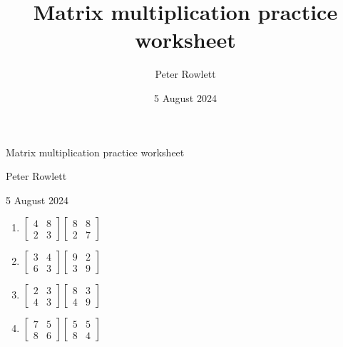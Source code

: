 \documentclass[20pt]{extarticle}
\title{Matrix multiplication practice worksheet}
\author{Peter Rowlett}
\date{5 August 2024}
\begin{document}
    \centering
    \huge Matrix multiplication practice worksheet\medskip
    
    \Large
    Peter Rowlett\medskip
    
    5 August 2024\bigskip\bigskip
    
    \begin{minipage}{0.7\linewidth}
        \begin{multicols}{3}
            \begin{enumerate}
                \item \(\begin{bmatrix}
                        4 & 8\\
                        2 & 3
                    \end{bmatrix}\begin{bmatrix}
                        8 & 8\\
                        2 & 7
                    \end{bmatrix}\)
                \item \(\begin{bmatrix}
                        3 & 4\\
                        6 & 3
                    \end{bmatrix}\begin{bmatrix}
                        9 & 2\\
                        3 & 9
                    \end{bmatrix}\)
                \item \(\begin{bmatrix}
                        2 & 3\\
                        4 & 3
                    \end{bmatrix}\begin{bmatrix}
                        8 & 3\\
                        4 & 9
                    \end{bmatrix}\)
                \item \(\begin{bmatrix}
                        7 & 5\\
                        8 & 6
                    \end{bmatrix}\begin{bmatrix}
                        5 & 5\\
                        8 & 4
                    \end{bmatrix}\)

\end{enumerate}
\end{multicols}
\end{minipage}
\end{document}
